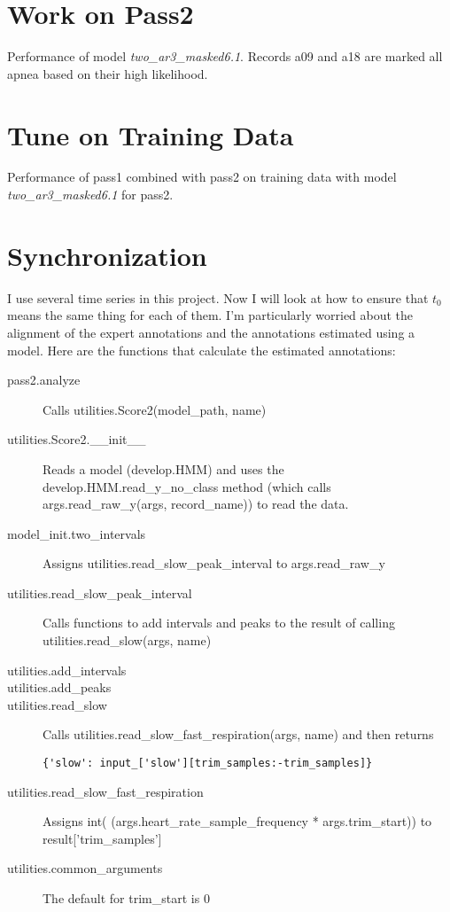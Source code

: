 \documentclass[12pt]{article}
\begin{document}
\section{Work on Pass2}
\label{sec:pass2}

\begin{table*}
  \centering
  
  \caption[Performance]{Performance of model
    \emph{two\_ar3\_masked6.1}.  Records a09 and a18 are marked all
    apnea based on their high likelihood.}
  \label{tab:pass2performance}
\end{table*}

\section{Tune on Training Data}
\label{sec:tune}

\begin{table*}
  \centering
  
  \caption[Performance]{Performance of pass1 combined with pass2 on
    training data with model
    \emph{two\_ar3\_masked6.1} for pass2.}
  \label{tab:score_initial}
\end{table*}

\section{Synchronization}
\label{sec:sync}

I use several time series in this project.  Now I will look at how to
ensure that $t_0$ means the same thing for each of them.  I'm
particularly worried about the alignment of the expert annotations
and the annotations estimated using a model.  Here are the functions
that calculate the estimated annotations:
\begin{description}
\item[pass2.analyze] Calls utilities.Score2(model\_path, name)
\item[utilities.Score2.\_\_init\_\_] Reads a model (develop.HMM) and
  uses the develop.HMM.read\_y\_no\_class method (which calls
  args.read\_raw\_y(args, record\_name)) to read the data.
\item[model\_init.two\_intervals] Assigns
  utilities.read\_slow\_peak\_interval to args.read\_raw\_y
\item[utilities.read\_slow\_peak\_interval] Calls functions to add
  intervals and peaks to the result of calling
  utilities.read\_slow(args, name)
\item[utilities.add\_intervals] 
\item[utilities.add\_peaks]
\item[utilities.read\_slow] Calls
  utilities.read\_slow\_fast\_respiration(args, name) and then returns
\begin{verbatim}
{'slow': input_['slow'][trim_samples:-trim_samples]}
\end{verbatim}
\item[utilities.read\_slow\_fast\_respiration] Assigns int(
  (args.heart\_rate\_sample\_frequency * args.trim\_start)) to
  result['trim\_samples']
\item[utilities.common\_arguments] The default for trim\_start is 0
\end{description}
\end{document}
